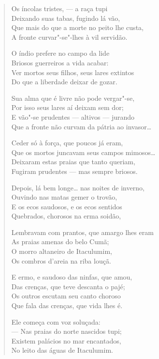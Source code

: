 \begin{verse}
Os íncolas tristes, --- a raça tupi\\
Deixando suas tabas, fugindo lá vão,\\
Que mais do que a morte no peito lhe custa,\\
A fronte curvar"-se"-lhes à vil servidão.

O índio prefere no campo da lide\\
Briosos guerreiros a vida acabar:\\
Ver mortos seus filhos, seus lares extintos\\
Do que a liberdade deixar de gozar.

Sua alma que é livre não pode vergar"-se,\\
Por isso seus lares aí deixam sem dor;\\
E vão"-se prudentes --- altivos --- jurando\\
Que a fronte não curvam da pátria ao invasor\ldots{}

\pagebreak

Ceder só à força, que poucos já eram,\\
Que os mortos juncavam seus campos \qb{}mimosos\ldots{}\\
Deixaram estas praias que tanto queriam,\\
Fugiram prudentes --- mas sempre briosos.

Depois, lá bem longe\ldots{} nas noites de inverno,\\
Ouvindo nas matas gemer o trovão,\\
E os ecos saudosos, e os ecos sentidos\\
Quebrados, chorosos na erma soidão,

Lembravam com prantos, que amargo lhes \qb{}eram\\
As praias amenas do belo Cumã;\\
O morro altaneiro de Itaculumim,\\
Os combros d'areia na riba louçã.

E ermo, e saudoso das ninfas, que amou,\\
Das crenças, que teve descanta o pajé;\\
Os outros escutam seu canto choroso\\
Que fala das crenças, que vida lhes é.

Ele começa com voz soluçada:\\
--- Nas praias do norte nascidos tupi;\\
Existem palácios no mar encantados,\\
No leito das águas de Itaculumim.


\end{verse}

